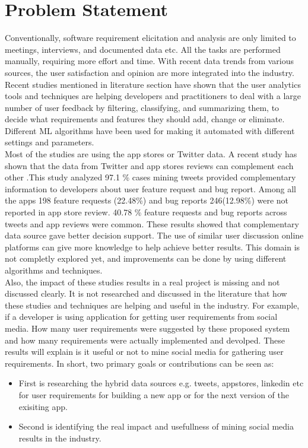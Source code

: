 \section{Problem Statement}
Conventionally, software requirement elicitation and analysis are only limited to meetings,
interviews, and documented data etc. All the tasks are performed manually, requiring more
effort and time. With recent data trends from various sources, the user satisfaction and opinion
are more integrated into the industry. Recent studies mentioned in literature section have shown that the user analytics tools
and techniques are helping developers and practitioners to deal with a large number of user
feedback by filtering, classifying, and summarizing them, to decide what requirements and
features they should add, change or eliminate. Different ML algorithms have been used for
making it automated with different settings and parameters.\\

	 Most of the studies are using the app stores or Twitter data. A recent study has shown that the data from Twitter and app
stores reviews can complement each other \cite{Nayebi}.This study analyzed  97.1 \% cases mining tweets provided complementary information to developers about user 
feature request and bug report. Among all the apps 198 feature requests (22.48\%) and bug reports 246(12.98\%) were not reported in app store review. 
40.78 \% feature requests and bug reports across tweets and app reviews were common. These results showed that complementary data source 
gave better decision support. The use of
similar user discussion online platforms can give more knowledge to help achieve better results. 
This domain is not completly explored yet, and improvements can be done by using different
algorithms and techniques. \\

Also, the impact of these studies results in a real project is missing and
not discussed clearly. It is not researched and discussed in the literature that how these studies and techniques are helping and useful in the industry. For example, if a developer is using application for getting user requirements from social media. How many user requirements were suggested by these proposed system and how many requirements were actually implemented and devolped. These results will explain is it useful or not to mine social media for gathering user requirements. In short, two primary goals or contributions can be seen as:\\
\begin{itemize}
  \item First is researching the hybrid data sources e.g. tweets, appstores, linkedin etc for user requirements for building a new app or for the next version of the exisiting app.
  \item Second is identifying the real impact and usefullness of mining social media results in the industry.
\end{itemize}

